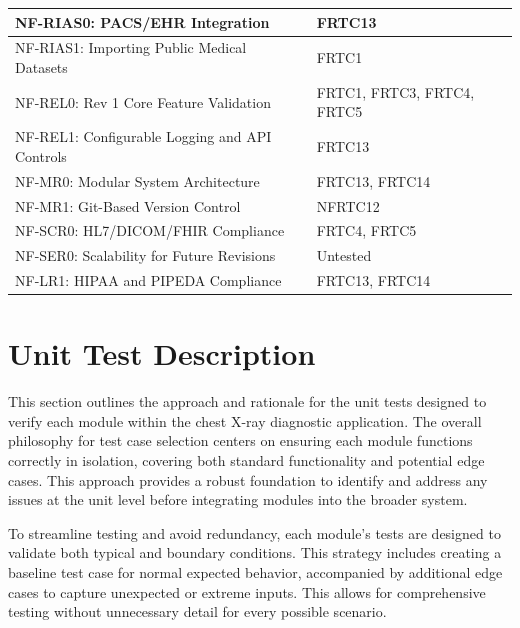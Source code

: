 \documentclass[12pt, titlepage]{article}
\begin{document}
\begin{table}[H]
\begin{tabularx}{\textwidth}{|>{\raggedright\arraybackslash}X|>{\raggedright\arraybackslash}m{}|}
    \hline
    NF-RIAS0: PACS/EHR Integration & FRTC13 \\
    \hline
    NF-RIAS1: Importing Public Medical Datasets & FRTC1 \\
    \hline
    NF-REL0: Rev 1 Core Feature Validation & FRTC1, FRTC3, FRTC4, FRTC5 \\
    \hline
    NF-REL1: Configurable Logging and API Controls & FRTC13 \\
    \hline
    NF-MR0: Modular System Architecture & FRTC13, FRTC14 \\
    \hline
    NF-MR1: Git-Based Version Control & NFRTC12 \\
    \hline
    NF-SCR0: HL7/DICOM/FHIR Compliance & FRTC4, FRTC5 \\
    \hline
    NF-SER0: Scalability for Future Revisions & Untested \\
    \hline
    NF-LR1: HIPAA and PIPEDA Compliance & FRTC13, FRTC14 \\
    \hline
  \end{tabularx}
\end{table}


\section{Unit Test Description}


This section outlines the approach and rationale for the unit tests designed to verify each module within the chest X-ray diagnostic application. The overall philosophy for test case selection centers on ensuring each module functions correctly in isolation, covering both standard functionality and potential edge cases. This approach provides a robust foundation to identify and address any issues at the unit level before integrating modules into the broader system.

To streamline testing and avoid redundancy, each module's tests are designed to validate both typical and boundary conditions. This strategy includes creating a baseline test case for normal expected behavior, accompanied by additional edge cases to capture unexpected or extreme inputs. This allows for comprehensive testing without unnecessary detail for every possible scenario.
\end{document}
